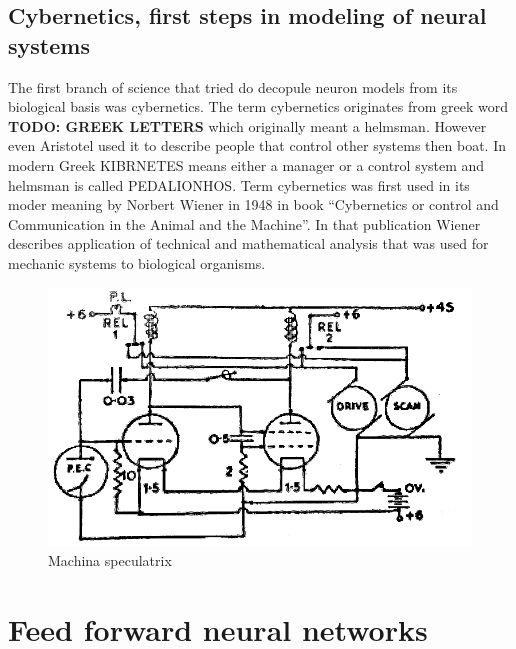 \subsection{Cybernetics, first steps in modeling of neural systems}
The first branch of science that tried do decopule neuron models from its biological basis was 
cybernetics. The term cybernetics originates from greek word \textbf{TODO: GREEK LETTERS} which
originally meant a helmsman. However even Aristotel used it to describe people that control 
other systems then boat. In modern Greek KIBRNETES means either a manager or a control system and 
helmsman is called PEDALIONHOS.
Term cybernetics was first used in its moder meaning by Norbert Wiener in 1948 in book 
``Cybernetics or control and Communication in the Animal and the Machine''. 
In that publication Wiener describes application of technical and mathematical analysis 
that was used for mechanic systems to biological organisms.
\begin{figure}[hb]
	\includegraphics[width=\textwidth]{res/speculatrix}
	\caption{Machina speculatrix}
	\label{fig:machina_speculatrix}
\end{figure}




\section{Feed forward neural networks}

